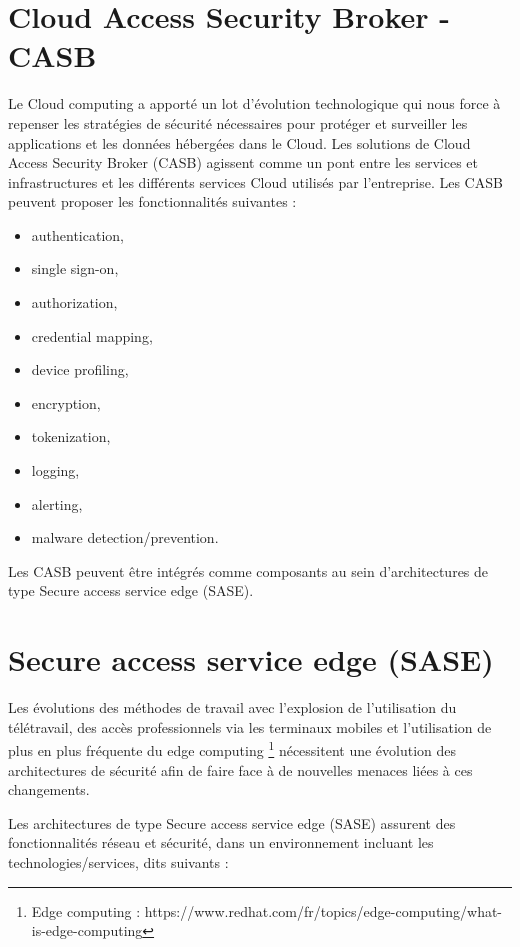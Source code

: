 \section{Cloud Access Security Broker - CASB}
Le Cloud computing a apporté un lot d'évolution technologique qui nous force à repenser les stratégies de sécurité nécessaires pour protéger et surveiller les applications et les données hébergées dans le Cloud.
Les solutions de Cloud Access Security Broker (CASB) agissent comme un pont entre les services et infrastructures  et les différents services Cloud utilisés par l'entreprise.
Les CASB peuvent proposer les fonctionnalités suivantes : 
\begin{itemize}
    \item authentication,
    \item single sign-on, 
   \item  authorization, 
   \item  credential mapping, 
    \item device profiling, 
    \item encryption, 
    \item tokenization, 
   \item  logging, 
    \item alerting, 
    \item malware detection/prevention.
\end{itemize}

Les CASB peuvent être intégrés comme composants au sein d'architectures de type Secure access service edge (SASE).

\section{Secure access service edge (SASE)}
Les évolutions des méthodes de travail avec l'explosion de l'utilisation du télétravail, des accès professionnels via les terminaux mobiles et l'utilisation de plus en plus fréquente du edge computing \footnote{Edge computing : https://www.redhat.com/fr/topics/edge-computing/what-is-edge-computing} nécessitent une évolution des architectures de sécurité afin de faire face à de nouvelles menaces liées à ces changements.

Les architectures de type Secure access service edge (SASE) assurent des fonctionnalités réseau et sécurité, dans un environnement  incluant les technologies/services, dits  suivants :


